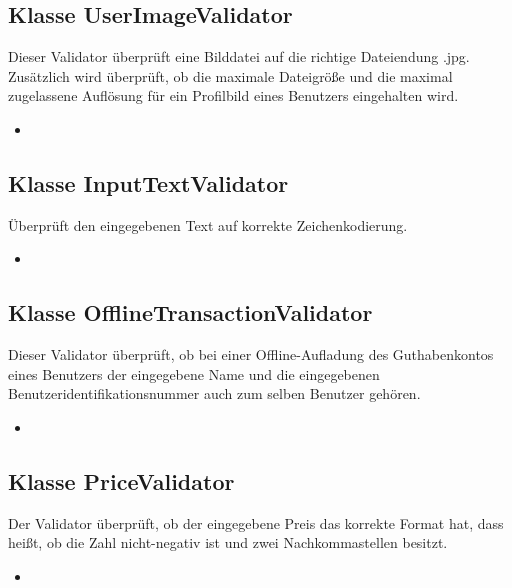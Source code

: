 	\subsection{Klasse UserImageValidator}
	Dieser Validator überprüft eine Bilddatei auf die richtige Dateiendung .jpg. Zusätzlich wird überprüft, ob
	die maximale Dateigröße und die maximal zugelassene Auflösung für ein Profilbild eines Benutzers eingehalten wird.
	\begin{itemize}
		\item \override
	\end{itemize}
	
	\subsection{Klasse InputTextValidator}
	Überprüft den eingegebenen Text auf korrekte Zeichenkodierung.
	\begin{itemize}
		\item \override
	\end{itemize}
	
	\subsection{Klasse OfflineTransactionValidator}
	Dieser Validator überprüft, ob bei einer Offline-Aufladung des Guthabenkontos eines Benutzers der eingegebene Name und die eingegebenen Benutzeridentifikationsnummer auch zum selben Benutzer gehören.
	\begin{itemize}
		\item \override
	\end{itemize}
	
	\subsection{Klasse PriceValidator}
	Der Validator überprüft, ob der eingegebene Preis das korrekte Format hat, dass heißt, ob die Zahl nicht-negativ ist und zwei Nachkommastellen besitzt.
	\begin{itemize}
		\item \override
	\end{itemize}
	
